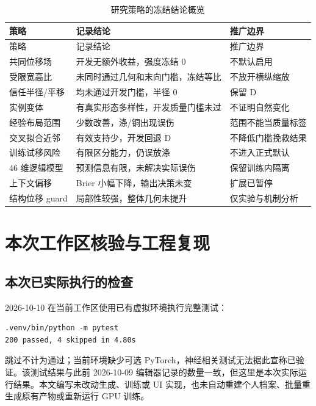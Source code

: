 \documentclass[UTF8,a4paper,11pt,fontset=fandol]{ctexart}
\begin{document}
\begin{longtable}{L{33mm}L{70mm}L{39mm}}
\caption{研究策略的冻结结论概览}\\\toprule
策略 & 记录结论 & 推广边界\\\midrule\endfirsthead
\toprule 策略 & 记录结论 & 推广边界\\\midrule\endhead
共同位移场 & 开发无额外收益，强度冻结 0 & 不默认启用\\
受限宽高比 & 未同时通过几何和末向门槛，冻结等比 & 不放开横纵缩放\\
信任半径/平移 & 均未通过开发门槛，半径 0 & 保留 D\\
实例变体 & 有真实形态多样性，开发质量门槛未过 & 不证明自然变化\\
经验布局范围 & 少数改善，涤/铜出现误伤 & 范围不能当质量标签\\
交叉拟合近邻 & 有效支持少，开发回退 D & 不降低门槛挽救结果\\
训练试移风险 & 有限区分能力，仍误放涤 & 不进入正式默认\\
46 维逻辑模型 & 预测信息有限，未解决实际误伤 & 保留训练内隔离\\
上下文偏移 & Brier 小幅下降，输出决策未变 & 扩展已暂停\\
结构位移 guard & 局部性较强，整体几何未提升 & 仅实验与机制分析\\
\bottomrule
\end{longtable}

\section{本次工作区核验与工程复现}
\subsection{本次已实际执行的检查}
2026-10-10 在当前工作区使用已有虚拟环境执行完整测试：
\begin{lstlisting}
.venv/bin/python -m pytest
200 passed, 4 skipped in 4.80s
\end{lstlisting}
跳过不计为通过；当前环境缺少可选 PyTorch，神经相关测试无法据此宣称已验证。该测试结果与此前 2026-10-09 编辑器记录的数量一致，但这里是本次实际运行结果。本文编写未改动生成、训练或 UI 实现，也未自动重建个人档案、批量重生成原有产物或重新运行 GPU 训练。
\end{document}
